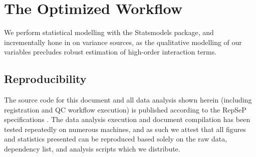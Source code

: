 \section{The Optimized Workflow}
We perform statistical modelling with the Statsmodels \cite{statsmodels} package, and incrementally hone in on variance sources, as the qualitative modelling of our variables precludes robust estimation of high-order interaction terms.

\subsection{Reproducibility}

The source code for this document and all data analysis shown herein (including registration and QC workflow execution) is published according to the RepSeP specifications \cite{repsep}.
The data analysis execution and document compilation has been tested repeatedly on numerous machines, and as such we attest that all figures and statistics presented can be reproduced based solely on the raw data, dependency list, and analysis scripts which we distribute.

